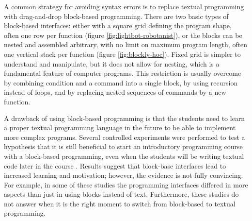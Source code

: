 A common strategy for avoiding syntax errors is to replace textual programming
with drag-and-drop block-based programming.
There are two basic types of block-based interfaces:
  either with a square grid defining the program shape,
  often one row per function
  (figure \ref{fig:lightbot-robotanist}),
  or the blocks can be nested and assembled arbitrary,
  with no limit on maximum program length,
  often one vertical stack per function
  (figure \ref{fig:blockly-hoc}).
Fixed grid is simpler to understand and manipulate,
  but it does not allow for nesting,
  which is a fundamental feature of computer programs.
This restriction is usually overcome by
  combining condition and a command into a single block,
  by using recursion instead of loops,
  and by replacing nested sequences of commands by a new function.


A drawback of using block-based programming
  is that the students need to learn a proper textual programming language in
  the future to be able to implement more complex programs.
Several controlled experiments were performed to test a hypothesis
  that it is still beneficial to start an introductory programming course
  with a block-based programming,
  even when the students will be writing textual code later in the course
  \cite{comparing-blocks-text-price2015, comparing-blocks-text-weintrop2017}.
Results suggest that block-base interfaces lead to increased learning and
motivation; however, the evidence is not fully convincing. For example, in
some of these studies the programming interfaces differed in more aspects than
just in using blocks instead of text. Furthermore, these studies do not
answer when it is the right moment to switch from block-based to textual
programming.

